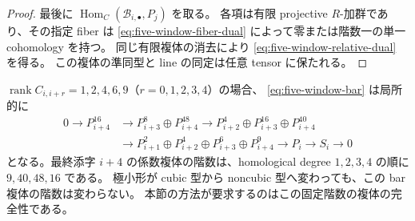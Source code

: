 \begin{proof}
最後に $\operatorname{Hom}_C(\mathcal B_{i,\bullet},P_j)$ を取る。
各項は有限 projective $R$-加群であり、その指定 fiber は
\eqref{eq:five-window-fiber-dual} によって零または階数一の単一 cohomology を持つ。
同じ有限複体の消去により \eqref{eq:five-window-relative-dual} を得る。
この複体の準同型と line の同定は任意 tensor に保たれる。
\end{proof}

\begin{remark}[二次曲面の固定階数の五頂点複体]
\label{rem:five-window-fixed-ranks}
$\operatorname{rank} C_{i,i+r}=1,2,4,6,9$（$r=0,1,2,3,4$）の場合、
\eqref{eq:five-window-bar} は局所的に
\begin{align*}
0\longrightarrow P_{i+4}^{16}&\longrightarrow
 P_{i+3}^{8}\oplus P_{i+4}^{48}
 \longrightarrow P_{i+2}^{4}\oplus P_{i+3}^{16}\oplus P_{i+4}^{40}\\
 &\longrightarrow P_{i+1}^{2}\oplus P_{i+2}^{4}
       \oplus P_{i+3}^{6}\oplus P_{i+4}^{9}
 \longrightarrow P_i\longrightarrow S_i\longrightarrow0
\end{align*}
となる。最終添字 $i+4$ の係数複体の階数は、homological degree
$1,2,3,4$ の順に $9,40,48,16$ である。
極小形が cubic 型から noncubic 型へ変わっても、この bar 複体の階数は変わらない。
本節の方法が要求するのはこの固定階数の複体の完全性である。
\end{remark}

